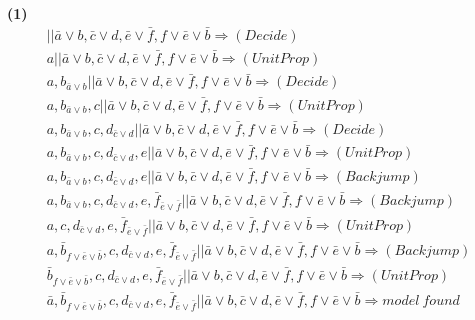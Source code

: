 \documentclass[11pt]{article}
\renewcommand{\part}[1] {\vspace{.10in} {\bf (#1)}}
\begin{document}
\part{1}
\begin{eqnarray*}
||\bar a \vee b, \bar c \vee d, \bar e \vee \bar f, f \vee \bar e \vee \bar b \Rightarrow (Decide)\\
a||\bar a \vee b, \bar c \vee d, \bar e \vee \bar f, f \vee \bar e \vee \bar b \Rightarrow (UnitProp)\\
a,b_{\bar a \vee b}||\bar a \vee b, \bar c \vee d, \bar e \vee \bar f, f \vee \bar e \vee \bar b \Rightarrow (Decide)\\
a, b_{\bar a \vee b}, c||\bar a \vee b, \bar c \vee d, \bar e \vee \bar f, f \vee \bar e \vee \bar b \Rightarrow (UnitProp)\\
a, b_{\bar a \vee b}, c, d_{\bar c \vee d}||\bar a \vee b, \bar c \vee d, \bar e \vee \bar f, f \vee \bar e \vee \bar b \Rightarrow (Decide)\\
a, b_{\bar a \vee b}, c, d_{\bar c \vee d}, e||\bar a \vee b, \bar c \vee d, \bar e \vee \bar f, f \vee \bar e \vee \bar b \Rightarrow (UnitProp)\\
a, b_{\bar a \vee b}, c, d_{\bar c \vee d}, e||\bar a \vee b, \bar c \vee d, \bar e \vee \bar f, f \vee \bar e \vee \bar b \Rightarrow (Backjump)\\
a, b_{\bar a \vee b}, c, d_{\bar c \vee d}, e, \bar f_{\bar e \vee \bar f}||\bar a \vee b, \bar c \vee d, \bar e \vee \bar f, f \vee \bar e \vee \bar b \Rightarrow (Backjump)\\
a, c, d_{\bar c \vee d}, e, \bar f_{\bar e \vee \bar f}||\bar a \vee b, \bar c \vee d, \bar e \vee \bar f, f \vee \bar e \vee \bar b \Rightarrow (UnitProp)\\
a, \bar b_{f \vee \bar e \vee \bar b}, c, d_{\bar c \vee d}, e, \bar f_{\bar e \vee \bar f}||\bar a \vee b, \bar c \vee d, \bar e \vee \bar f, f \vee \bar e \vee \bar b \Rightarrow (Backjump)\\
\bar b_{f \vee \bar e \vee \bar b}, c, d_{\bar c \vee d}, e, \bar f_{\bar e \vee \bar f}||\bar a \vee b, \bar c \vee d, \bar e \vee \bar f, f \vee \bar e \vee \bar b \Rightarrow (UnitProp)\\
\bar a, \bar b_{f \vee \bar e \vee \bar b}, c, d_{\bar c \vee d}, e, \bar f_{\bar e \vee \bar f}||\bar a \vee b, \bar c \vee d, \bar e \vee \bar f, f \vee \bar e \vee \bar b \Rightarrow model \ found\\
\end{eqnarray*}
\end{document}
